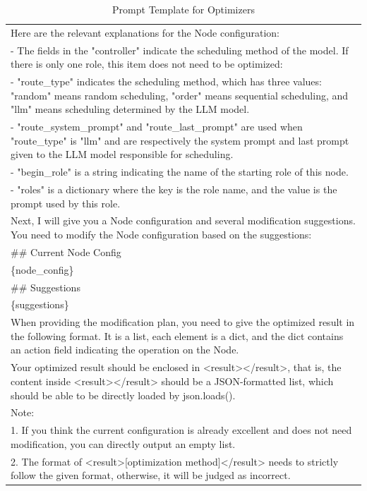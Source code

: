 \begin{table}[htbp]
{\begin{tabular}{p{15cm}}
Here are the relevant explanations for the Node configuration:\\
- The fields in the "controller" indicate the scheduling method of the model. If there is only one role, this item does not need to be optimized:\\
  - "route\_type" indicates the scheduling method, which has three values: "random" means random scheduling, "order" means sequential scheduling, and "llm" means scheduling determined by the LLM model.\\
  - "route\_system\_prompt" and "route\_last\_prompt" are used when "route\_type" is "llm" and are respectively the system prompt and last prompt given to the LLM model responsible for scheduling.\\
- "begin\_role" is a string indicating the name of the starting role of this node.\\
- "roles" is a dictionary where the key is the role name, and the value is the prompt used by this role.\par\\

Next, I will give you a Node configuration and several modification suggestions. You need to modify the Node configuration based on the suggestions:\par\\

\#\# Current Node Config\\
\{node\_config\}\par\\

\#\# Suggestions\\
\{suggestions\}\par\\

When providing the modification plan, you need to give the optimized result in the following format. It is a list, each element is a dict, and the dict contains an action field indicating the operation on the Node.\par\\

Your optimized result should be enclosed in <result></result>, that is, the content inside <result></result> should be a JSON-formatted list, which should be able to be directly loaded by json.loads().\par\\

Note:\\
1. If you think the current configuration is already excellent and does not need modification, you can directly output an empty list.\\
2. The format of <result>[optimization method]</result> needs to strictly follow the given format, otherwise, it will be judged as incorrect.\\
    \bottomrule
    \end{tabular}
}
    \caption{Prompt Template for Optimizers}
    \vspace{-0.1in}
    \label{tab:prompt_optimizers}
\end{table}